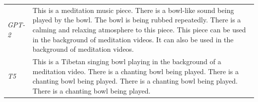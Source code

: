 \begin{table}[t]
\begin{tabularx}{\textwidth}{lX}
\emph{GPT-2} & This is a meditation music piece. There is a bowl-like sound being played by the bowl. The bowl is being rubbed repeatedly. There is a calming and relaxing atmosphere to this piece. This piece can be used in the background of meditation videos. It can also be used in the background of meditation videos. \\
\emph{T5} & This is a Tibetan singing bowl playing in the background of a meditation video. There is a chanting bowl being played. There is a chanting bowl being played. There is a chanting bowl being played. There is a chanting bowl being played. \\
\bottomrule
\end{tabularx}
\end{table}
